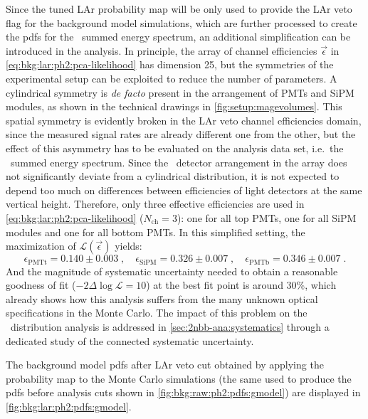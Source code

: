 Since the tuned LAr probability map will be only used to provide the LAr veto flag for the
background model simulations, which are further processed to create the pdfs for the
\bege\ summed energy spectrum, an additional simplification can be introduced in the
analysis. In principle, the array of channel efficiencies $\vec{\epsilon}$ in
\cref{eq:bkg:lar:ph2:pca-likelihood} has dimension 25, but the symmetries of the
experimental setup can be exploited to reduce the number of parameters. A cylindrical
symmetry is \emph{de facto} present in the arrangement of PMTs and SiPM modules, as shown
in the technical drawings in \cref{fig:setup:magevolumes}. This spatial symmetry is evidently
broken in the LAr veto channel efficiencies domain, since the measured signal rates are
already different one from the other, but the effect of this asymmetry has to be evaluated
on the analysis data set, i.e.~the \bege\ summed energy spectrum. Since the \bege\
detector arrangement in the array does not significantly deviate from a cylindrical
distribution, it is not expected to depend too much on differences between efficiencies of
light detectors at the same vertical height. Therefore, only three effective efficiencies
are used in \cref{eq:bkg:lar:ph2:pca-likelihood} ($N_\text{ch}=3$): one for all top PMTs,
one for all SiPM modules and one for all bottom PMTs.
\newpar
In this simplified setting, the maximization of $\mathcal{L}(\vec{\epsilon})$ yields:
\[
  \epsilon_\text{PMTt} = 0.140 \pm 0.003 \;, \quad
  \epsilon_\text{SiPM} = 0.326 \pm 0.007 \;, \quad
  \epsilon_\text{PMTb} = 0.346 \pm 0.007 \;.
\]
And the magnitude of systematic uncertainty needed to obtain a reasonable goodness of fit
($-2\Delta\log\mathcal{L}=10$) at the best fit point is around 30\%, which already shows
how this analysis suffers from the many unknown optical specifications in the Monte Carlo.
The impact of this problem on the \nnbb\ distribution analysis is addressed in
\cref{sec:2nbb-ana:systematics} through a dedicated study of the connected systematic
uncertainty.

The background model pdfs after LAr veto cut obtained by applying the probability map to
the Monte Carlo simulations (the same used to produce the pdfs before analysis cuts shown
in \cref{fig:bkg:raw:ph2:pdfs:gmodel}) are displayed in
\cref{fig:bkg:lar:ph2:pdfs:gmodel}. 

